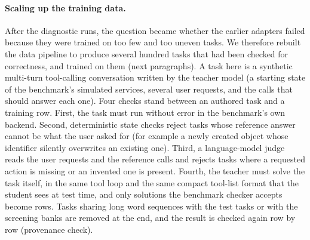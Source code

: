 
\paragraph{Scaling up the training data.} After the diagnostic runs, the question became whether the earlier adapters failed because they were trained on too few and too uneven tasks. We therefore rebuilt the data pipeline to produce several hundred tasks that had been checked for correctness, and trained on them (next paragraphs). A task here is a synthetic multi-turn tool-calling conversation written by the teacher model (a starting state of the benchmark's simulated services, several user requests, and the calls that should answer each one). Four checks stand between an authored task and a training row. First, the task must run without error in the benchmark's own backend. Second, deterministic state checks reject tasks whose reference answer cannot be what the user asked for (for example a newly created object whose identifier silently overwrites an existing one). Third, a language-model judge reads the user requests and the reference calls and rejects tasks where a requested action is missing or an invented one is present. Fourth, the teacher must solve the task itself, in the same tool loop and the same compact tool-list format that the student sees at test time, and only solutions the benchmark checker accepts become rows. Tasks sharing long word sequences with the test tasks or with the screening banks are removed at the end, and the result is checked again row by row (provenance check). %
